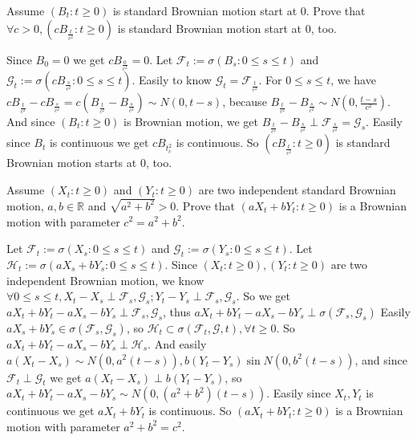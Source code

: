 \documentclass[../main]{subfiles}
\begin{document}
\begin{problem}\label{pro:2}
  Assume \((B_t:t \geq 0)\) is standard Brownian motion start at \(0\).
  Prove that \(\forall c>0,(c B_{\frac{t}{c^2}}:t \geq 0)\) is standard Brownian motion start at \(0\), too.
\end{problem}
\begin{solution}
  Since \(B_0=0\) we get \(c B_{\frac{0}{c^2}}=0\).
  Let \(\mathcal{F}_t:=\sigma(B_s:0 \leq s \leq t)\) and \(\mathcal{G}_t:=\sigma(c B_{\frac{s}{c^2}}:0 \leq s \leq t)\).
  Easily to know \(\mathcal{G}_t=\mathcal{F}_{\frac{t}{c^2}}\).
  For \(0 \leq s \leq t\), we have \(c B_{\frac{t}{c^2}}-c B_{\frac{s}{c^2}}= c(B_{\frac{t}{c^2}}-B_{\frac{s}{c^2}}) \sim N(0,t-s)\),
  because \(B_{\frac{t}{c^2}}-B_{\frac{s}{c^2}} \sim N(0,\frac{t-s}{c^2})\).
  And since \((B_t:t \geq 0)\) is Brownian motion, we get \(B_{\frac{t}{c^2}}-B_{\frac{s}{c^2}} \perp \mathcal{F}_{\frac{s}{c^2}}=\mathcal{G}_s\).
  Easily since \(B_t\) is continuous we get \(c B_{t_c^2}\) is continuous.
  So \((c B_{\frac{t}{c^2}}:t \geq 0)\) is standard Brownian motion starts at \(0\), too.
\end{solution}
\begin{problem}\label{pro:3}
  Assume \((X_t:t \geq 0)\) and \((Y_t:t \geq 0)\) are two independent standard Brownian motion, \(a,b \in \mathbb{R}\) and \(\sqrt{a^2 + b^2} >0\).
  Prove that \((aX_t + bY_t:t \geq 0)\) is a Brownian motion with parameter \(c^2=a^2 + b^2\).
\end{problem}
\begin{solution}
  Let \(\mathcal{F}_t:=\sigma(X_s:0 \leq s \leq t)\) and \(\mathcal{G}_t:=\sigma(Y_s:0 \leq s \leq t)\).
  Let \(\mathcal{H}_t:=\sigma(a X_s + b Y_s:0 \leq s \leq t)\).
  Since \((X_t:t \geq 0),(Y_t:t \geq 0)\) are two independent Brownian motion, we know \(\forall 0 \leq s \leq t,X_t - X_s \perp \mathcal{F}_s,\mathcal{G}_s;Y_t-Y_s \perp \mathcal{F}_s,\mathcal{G}_s\).
  So we get \(aX_t+bY_t-aX_s-bY_s \perp \mathcal{F}_s,\mathcal{G}_s\), thus \(aX_t+bY_t-aX_s-bY_s \perp \sigma(\mathcal{F}_s,\mathcal{G}_s)\)
  Easily \(a X_s+bY_s \in \sigma(\mathcal{F}_s,\mathcal{G}_s)\), so \(\mathcal{H}_t \subset \sigma(\mathcal{F}_t,\mathcal{G},t),\forall t \geq 0\).
  So \(a X_t+bY_t-aX_s-bY_s \perp \mathcal{H}_s\).
  And easily \(a(X_t-X_s) \sim N(0,a^2(t-s)),b(Y_t-Y_s) \sin N(0,b^2(t-s))\), and since \(\mathcal{F}_t \perp \mathcal{G}_t\) we get \(a(X_t-X_s) \perp b(Y_t-Y_s)\),
  so \(a X_t+bY_t-aX_s-bY_s \sim N(0,(a^2 + b^2)(t-s))\).
  Easily since \(X_t,Y_t\) is continuous we get \(a X_t + b Y_t\) is continuous.
  So \((a X_t + b Y_t:t \geq 0)\) is a Brownian motion with parameter \(a^2 + b^2 = c^2\).
\end{solution}
\end{document}
